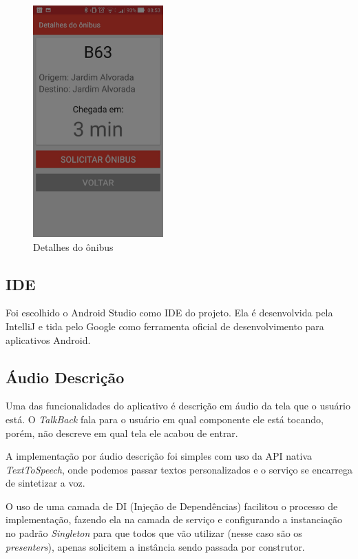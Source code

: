 \documentclass[
	12pt,				%
	oneside,			%
	a4paper,			%
	brazil				%
]{abntex2}
\begin{document}
{\begin{figure}[H]
\centering
\begin{minipage}{.5\textwidth}
  \centering
  \includegraphics[width=5cm]{images/beacon_detail_bus}
  \caption{Detalhes do ônibus}
  \label{Rotulo}
\end{minipage}%
\end{figure}

\newpage

\subsection{IDE}

Foi escolhido o Android Studio como IDE do projeto. Ela é desenvolvida pela IntelliJ e tida pelo Google como ferramenta oficial de desenvolvimento para aplicativos Android.

\subsection{Áudio Descrição}

Uma das funcionalidades do aplicativo é descrição em áudio da tela que o usuário está. O \textit{TalkBack} fala para o usuário em qual componente ele está tocando, porém, não descreve em qual tela ele acabou de entrar. 

A implementação por áudio descrição foi simples com uso da API nativa \textit{TextToSpeech}, onde podemos passar textos personalizados e o serviço se encarrega de sintetizar a voz.

O uso de uma camada de DI (Injeção de Dependências) facilitou o processo de implementação, fazendo ela na camada de serviço e configurando a instanciação no padrão \textit{Singleton} para que todos que vão utilizar (nesse caso são os \textit{presenters}), apenas solicitem a instância sendo passada por construtor.

}
\end{document}

